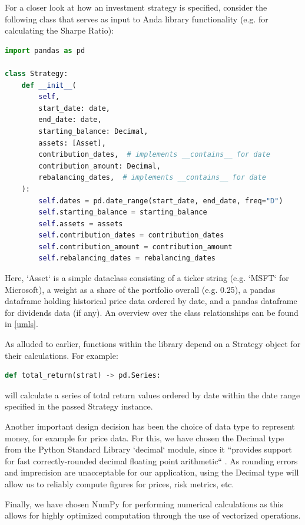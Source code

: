 \documentclass[main.tex]{subfiles}
\begin{document}
For a closer look at how an investment strategy is specified, consider the following class that serves as input to Anda library functionality (e.g. for calculating the Sharpe Ratio):

\begin{lstlisting}[language=Python, caption=Strategy Object Specification]
import pandas as pd

class Strategy:
    def __init__(
        self,
        start_date: date,
        end_date: date,
        starting_balance: Decimal,
        assets: [Asset],
        contribution_dates,  # implements __contains__ for date
        contribution_amount: Decimal,
        rebalancing_dates,  # implements __contains__ for date
    ):
        self.dates = pd.date_range(start_date, end_date, freq="D")
        self.starting_balance = starting_balance
        self.assets = assets
        self.contribution_dates = contribution_dates
        self.contribution_amount = contribution_amount
        self.rebalancing_dates = rebalancing_dates
\end{lstlisting}

Here, `Asset` is a simple dataclass consisting of a ticker string (e.g. `MSFT` for Microsoft), a weight as a share of the portfolio overall (e.g. 0.25), a pandas dataframe holding historical price data ordered by date, and a pandas dataframe for dividends data (if any). An overview over the class relationships can be found in \ref{umls}.

As alluded to earlier, functions within the library depend on a Strategy object for their calculations. For example:

\begin{lstlisting}[language=Python, caption=Example Function Signature]
def total_return(strat) -> pd.Series:
\end{lstlisting}
will calculate a series of total return values ordered by date within the date range specified in the passed Strategy instance.

Another important design decision has been the choice of data type to represent money, for example for price data. For this, we have chosen the Decimal type from the Python Standard Library `decimal` module, since it ``provides support for fast correctly-rounded decimal floating point arithmetic`` \cite{PyDecimal}. As rounding errors and imprecision are unacceptable for our application, using the Decimal type will allow us to reliably compute figures for prices, risk metrics, etc.

Finally, we have chosen NumPy \cite{walt2011numpy} for performing numerical calculations as this allows for highly optimized computation through the use of vectorized operations.
\end{document}
